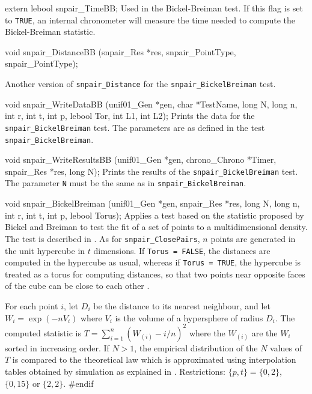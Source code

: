 \ifdetailed  %


\fi  %
\hide %
\code

extern lebool snpair_TimeBB;
\endcode
 \tab Used in the Bickel-Breiman test. If this flag is set to {\tt TRUE},
   an internal chronometer will measure the time needed to
   compute the Bickel-Breiman statistic. 
 \endtab
\code


void snpair_DistanceBB (snpair_Res *res, snpair_PointType, snpair_PointType);

\endcode
 \tab Another version of {\tt snpair\_Distance} for the
  {\tt snpair\_BickelBreiman} test.
\endtab
\endhide %
\ifdetailed %
\code


void snpair_WriteDataBB (unif01_Gen *gen, char *TestName, long N, long n,
                         int r, int t, int p, lebool Tor, int L1, int L2);
\endcode
 \tab Prints the data for the {\tt snpair\_BickelBreiman} test. The parameters
  are as defined in the test {\tt snpair\_BickelBreiman}.
 \endtab
\code


void snpair_WriteResultsBB (unif01_Gen *gen, chrono_Chrono *Timer,
                            snpair_Res *res, long N);
\endcode
 \tab Prints the results of the {\tt snpair\_BickelBreiman} test.
  The parameter {\tt N} must be the same as in  {\tt snpair\_BickelBreiman}.
 \endtab
\fi  %
\code


void snpair_BickelBreiman (unif01_Gen *gen, snpair_Res *res, long N,
                           long n, int r, int t, int p, lebool Torus);
\endcode
\tab
 Applies a test based on the statistic proposed by
 Bickel and Breiman \cite {tBIC83a} to test the fit of a set of
 points to a multidimensional density.
 The test is described in \cite{rLEC00c}.
 As for {\tt snpair\_ClosePairs}, $n$ points are generated in the 
 unit hypercube in $t$ dimensions.
 If {\tt Torus = FALSE}, the distances are computed in the hypercube 
 as usual, whereas if {\tt Torus = TRUE}, the hypercube is treated as a
 torus for computing distances, so that two points near
 opposite  faces of the cube can be close to each other \cite{rLEC00c}.

 For each point $i$, let $D_i$ be the distance to its nearest neighbour,
 and let $W_i = \exp(-nV_i)$ where $V_i$ is the volume of a hypersphere of
 radius $D_i$.  The computed statistic is
 $T = \sum_{i=1}^{n}(W_{(i)} - {i / n})^2$
 where the $W_{(i)}$ are the $W_i$ sorted in increasing order.
 If $N>1$, the empirical distribution of the $N$ values of $T$
 is compared to the theoretical law which is approximated using
 interpolation tables obtained by simulation as explained in \cite{rLEC00c}.
 Restrictions: $\{p, t\} = \{0, 2\}$,  $\{0, 15\}$ or $\{2, 2\}$.
 \endtab
\hide  %
\code
#endif
\endcode
\endhide
